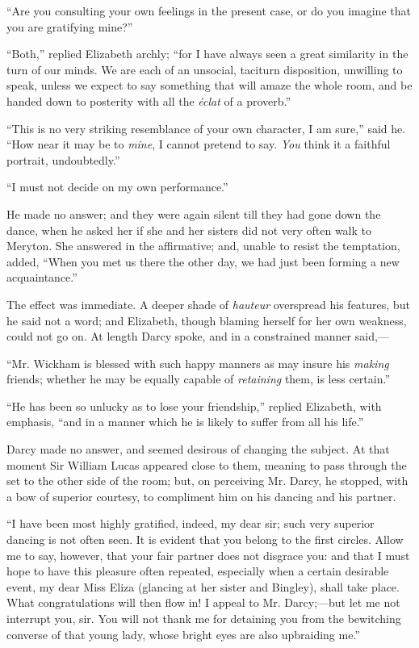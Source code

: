 \documentclass[12pt]{book}
\begin{document}
``Are you consulting your own feelings in the present case, or do you imagine that you are gratifying mine?''

``Both,'' replied Elizabeth archly; ``for I have always seen a great similarity in the turn of our minds. We are each of an unsocial, taciturn disposition, unwilling to speak, unless we expect to say something that will amaze the whole room, and be handed down to posterity with all the \textit{éclat} of a proverb.''

``This is no very striking resemblance of your own character, I am sure,'' said he. ``How near it may be to \textit{mine}, I cannot pretend to say. \textit{You} think it a faithful portrait, undoubtedly.''

``I must not decide on my own performance.''

He made no answer; and they were again silent till they had gone down the dance, when he asked her if she and her sisters did not very often walk to Meryton. She answered in the affirmative; and, unable to resist the temptation, added, ``When you met us there the other day, we had just been forming a new acquaintance.''

The effect was immediate. A deeper shade of \textit{hauteur} overspread his features, but he said not a word; and Elizabeth, though blaming herself for her own weakness, could not go on. At length Darcy spoke, and in a constrained manner said,---

``Mr. Wickham is blessed with such happy manners as may insure his \textit{making} friends; whether he may be equally capable of \textit{retaining} them, is less certain.''

``He has been so unlucky as to lose your friendship,'' replied Elizabeth, with emphasis, ``and in a manner which he is likely to suffer from all his life.''

Darcy made no answer, and seemed desirous of changing the subject. At that moment Sir William Lucas appeared close to them, meaning to pass through the set to the other side of the room; but, on perceiving Mr. Darcy, he stopped, with a bow of superior courtesy, to compliment him on his dancing and his partner.

``I have been most highly gratified, indeed, my dear sir; such very superior dancing is not often seen. It is evident that you belong to the first circles. Allow me to say, however, that your fair partner does not disgrace you: and that I must hope to have this pleasure often repeated, especially when a certain desirable event, my dear Miss Eliza (glancing at her sister and Bingley), shall take place. What congratulations will then flow in! I appeal to Mr. Darcy;---but let me not interrupt you, sir. You will not thank me for detaining you from the bewitching converse of that young lady, whose bright eyes are also upbraiding me.''
\end{document}
